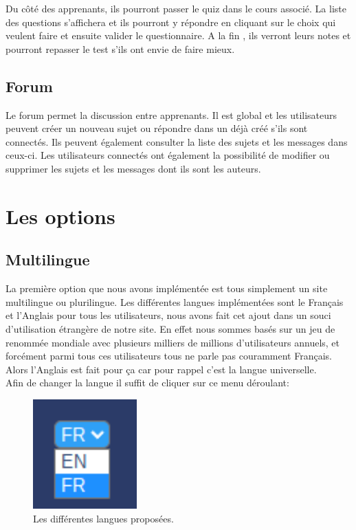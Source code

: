 \documentclass[a4paper,10pt]{article}
\begin{document}
Du côté des apprenants, ils pourront passer le quiz dans le cours associé. La liste des questions s'affichera et ils pourront y répondre en cliquant sur le choix qui veulent faire et ensuite valider le questionnaire.
A la fin , ils verront leurs notes et pourront repasser le test s'ils ont envie de faire mieux.
\subsection{Forum}
Le forum permet la discussion entre apprenants. Il est global et les utilisateurs peuvent créer un nouveau sujet ou répondre dans un déjà créé s'ils sont connectés. Ils peuvent également consulter la liste des sujets et les messages dans ceux-ci. Les utilisateurs connectés ont également la possibilité de modifier ou supprimer les sujets et les messages dont ils sont les auteurs. 


\section{Les options}
\subsection{Multilingue}
La première option que nous avons implémentée est tous simplement un site multilingue ou plurilingue. Les différentes langues implémentées sont le Français et l'Anglais pour tous les utilisateurs, nous avons fait cet ajout dans un souci d'utilisation étrangère de notre site. En effet nous sommes basés sur un jeu de renommée mondiale avec plusieurs milliers de millions d'utilisateurs annuels, et forcément parmi tous ces utilisateurs tous ne parle pas couramment Français. Alors l'Anglais est fait pour ça car pour rappel c'est la langue universelle.\\

Afin de changer la langue il suffit de cliquer sur ce menu déroulant:
\begin{figure}[!h]
\centerline{\includegraphics[width=4cm]{images/menuLangues.PNG}}
\caption{Les différentes langues proposées.}
\label{fig}
\end{figure}
\end{document}
